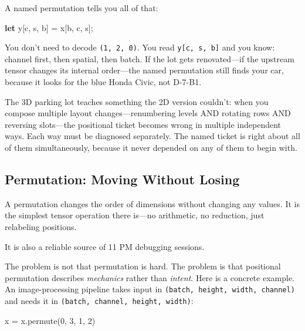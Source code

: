 \documentclass[11pt,titlepage]{article}
\newenvironment{Shaded}{}{}
\newcommand{\DecValTok}[1]{\textcolor[rgb]{0.25,0.63,0.44}{#1}}
\newcommand{\KeywordTok}[1]{\textcolor[rgb]{0.00,0.44,0.13}{\textbf{#1}}}
\newcommand{\NormalTok}[1]{#1}
\newcommand{\OperatorTok}[1]{\textcolor[rgb]{0.40,0.40,0.40}{#1}}
\begin{document}
A named permutation tells you all of that:

\begin{Shaded}
\begin{Highlighting}[]
\KeywordTok{let}\NormalTok{ y}\OperatorTok{[}\NormalTok{c, s, b}\OperatorTok{]}\NormalTok{ = x}\OperatorTok{[}\NormalTok{b, c, s}\OperatorTok{]}\NormalTok{;}
\end{Highlighting}
\end{Shaded}

You don't need to decode \texttt{(1,\ 2,\ 0)}. You read
\texttt{y{[}c,\ s,\ b{]}} and you know: channel first, then spatial,
then batch. If the lot gets renovated---if the upstream tensor changes
its internal order---the named permutation still finds your car, because
it looks for the blue Honda Civic, not D-7-B1.

The 3D parking lot teaches something the 2D version couldn't: when you
compose multiple layout changes---renumbering levels AND rotating rows
AND reversing slots---the positional ticket becomes wrong in multiple
independent ways. Each way must be diagnosed separately. The named
ticket is right about all of them simultaneously, because it never
depended on any of them to begin with.

\vspace{2em}

\hypertarget{permutation-moving-without-losing}{%
\subsection{Permutation: Moving Without
Losing}\label{permutation-moving-without-losing}}

A permutation changes the order of dimensions without changing any
values. It is the simplest tensor operation there is---no arithmetic, no
reduction, just relabeling positions.

It is also a reliable source of 11 PM debugging sessions.

The problem is not that permutation is hard. The problem is that
positional permutation describes \emph{mechanics} rather than
\emph{intent}. Here is a concrete example. An image-processing pipeline
takes input in \texttt{(batch,\ height,\ width,\ channel)} and needs it
in \texttt{(batch,\ channel,\ height,\ width)}:

\begin{Shaded}
\begin{Highlighting}[]
\NormalTok{x }\OperatorTok{=}\NormalTok{ x.permute(}\DecValTok{0}\NormalTok{, }\DecValTok{3}\NormalTok{, }\DecValTok{1}\NormalTok{, }\DecValTok{2}\NormalTok{)}
\end{Highlighting}
\end{Shaded}
\end{document}
